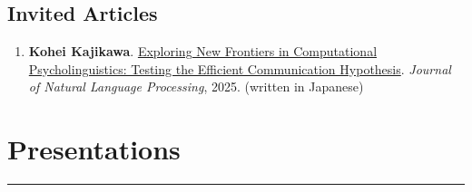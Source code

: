 \documentclass[10pt,a4paper]{article}
\newcommand{\rulegap}{\vspace{6pt}}
\begin{document}
\subsection*{Invited Articles}
\begin{enumerate}
    \item \textbf{Kohei Kajikawa}. \href{https://www.jstage.jst.go.jp/article/jnlp/32/1/32_372/_article/-char/ja/}{Exploring New Frontiers in Computational Psycholinguistics: Testing the Efficient Communication Hypothesis}. \textit{Journal of Natural Language Processing}, 2025. (written in Japanese)
\end{enumerate}


\section*{Presentations}
\hrule
\rulegap
\end{document}
